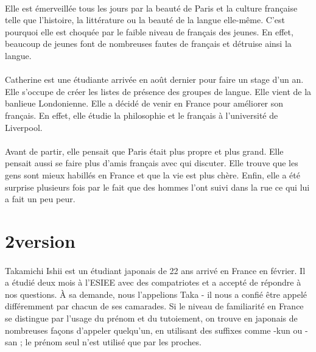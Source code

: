 \paragraph{} Elle est émerveillée tous les jours par la beauté de Paris et la
culture française telle que l'histoire, la littérature ou la beauté de la
langue elle-même. C'est pourquoi elle est choquée par le faible niveau de
français des jeunes. En effet, beaucoup de jeunes font de nombreuses fautes de
français et détruise ainsi la langue.

\paragraph{} Catherine est une étudiante arrivée en août dernier pour faire un
stage d'un an. Elle s'occupe de créer les listes de présence des groupes de
langue. Elle vient de la banlieue Londonienne. Elle a décidé de venir en
France pour améliorer son français. En effet, elle étudie la philosophie et le
français à l'université de Liverpool.

\paragraph{} Avant de partir, elle pensait que Paris était plus propre et plus
grand. Elle pensait aussi se faire plus d'amis français avec qui discuter.
Elle trouve que les gens sont mieux habillés en France et que la vie est plus
chère. Enfin,  elle a été surprise plusieurs fois par le fait que des hommes
l'ont suivi dans la rue ce qui lui a fait un peu peur.


\section{2\ieme version}

\paragraph{} Takamichi Ishii est un étudiant japonais de 22 ans arrivé en
France en février. Il a étudié deux mois à l'ESIEE avec des compatriotes et a
accepté de répondre à nos questions. À sa demande, nous l'appelions Taka - il
nous a confié être appelé différemment par chacun de ses camarades. Si le
niveau de familiarité en France se distingue par l'usage du prénom et du
tutoiement, on trouve en japonais de nombreuses façons d'appeler quelqu'un, en
utilisant des suffixes comme -kun ou -san ; le prénom seul n'est utilisé que
par les proches.

